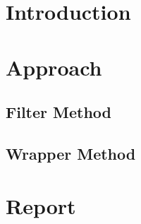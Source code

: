 \documentclass[12pt,twoside,a4paper]{article}
\title{\mytitle}
\author{\myauthors}
\date{\mydate}
\begin{document}
\maketitle

\begin{abstract}

This project primarily deals with feature subset selection for the classification problem through the use of the Taiji sequence dataset. The use of feature selection is to solve the issues of 'Curse of Dimensionality', computational efficiency, easier data collection, storage size, and interpretability through the strategy of dimensionality reduction. Implementations of the feature selection algorithms in this project include \textbf{Filtering} and \textbf{Wrapper} methods. 

\end{abstract}
\vspace{1ex}

\tableofcontents


\section{Introduction}

\section{Approach}

\subsection{Filter Method}

\subsection{Wrapper Method}

\section{Report}

\end{document}
